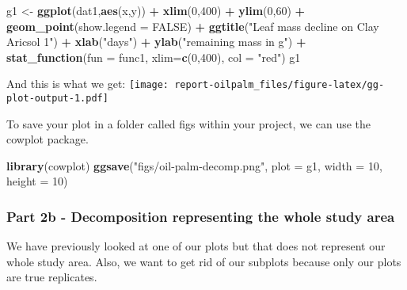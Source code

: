 \documentclass[
]{article}
\newenvironment{Shaded}{\begin{snugshade}}{\end{snugshade}}
\newcommand{\DataTypeTok}[1]{\textcolor[rgb]{0.13,0.29,0.53}{#1}}
\newcommand{\DecValTok}[1]{\textcolor[rgb]{0.00,0.00,0.81}{#1}}
\newcommand{\KeywordTok}[1]{\textcolor[rgb]{0.13,0.29,0.53}{\textbf{#1}}}
\newcommand{\NormalTok}[1]{#1}
\newcommand{\OperatorTok}[1]{\textcolor[rgb]{0.81,0.36,0.00}{\textbf{#1}}}
\newcommand{\OtherTok}[1]{\textcolor[rgb]{0.56,0.35,0.01}{#1}}
\newcommand{\StringTok}[1]{\textcolor[rgb]{0.31,0.60,0.02}{#1}}
\begin{document}
\begin{Shaded}
\begin{Highlighting}[]
\NormalTok{g1 <-}\StringTok{ }\KeywordTok{ggplot}\NormalTok{(dat1,}\KeywordTok{aes}\NormalTok{(x,y)) }\OperatorTok{+}
\StringTok{  }\KeywordTok{xlim}\NormalTok{(}\DecValTok{0}\NormalTok{,}\DecValTok{400}\NormalTok{) }\OperatorTok{+}
\StringTok{  }\KeywordTok{ylim}\NormalTok{(}\DecValTok{0}\NormalTok{,}\DecValTok{60}\NormalTok{) }\OperatorTok{+}
\StringTok{  }\KeywordTok{geom_point}\NormalTok{(}\DataTypeTok{show.legend =} \OtherTok{FALSE}\NormalTok{) }\OperatorTok{+}
\StringTok{  }\KeywordTok{ggtitle}\NormalTok{(}\StringTok{"Leaf mass decline on Clay Aricsol 1"}\NormalTok{) }\OperatorTok{+}
\StringTok{  }\KeywordTok{xlab}\NormalTok{(}\StringTok{"days"}\NormalTok{) }\OperatorTok{+}
\StringTok{  }\KeywordTok{ylab}\NormalTok{(}\StringTok{"remaining mass in g"}\NormalTok{) }\OperatorTok{+}
\StringTok{  }\KeywordTok{stat_function}\NormalTok{(}\DataTypeTok{fun =}\NormalTok{ func1, }\DataTypeTok{xlim=}\KeywordTok{c}\NormalTok{(}\DecValTok{0}\NormalTok{,}\DecValTok{400}\NormalTok{), }\DataTypeTok{col =} \StringTok{"red"}\NormalTok{)}
\NormalTok{g1}
\end{Highlighting}
\end{Shaded}

And this is what we get:
\texttt{[image: report-oilpalm\_files/figure-latex/gg-plot-output-1.pdf]}

To save your plot in a folder called figs within your project, we can
use the cowplot package.

\begin{Shaded}
\begin{Highlighting}[]
\KeywordTok{library}\NormalTok{(cowplot)}
\KeywordTok{ggsave}\NormalTok{(}\StringTok{"figs/oil-palm-decomp.png"}\NormalTok{, }\DataTypeTok{plot =}\NormalTok{ g1, }\DataTypeTok{width =} \DecValTok{10}\NormalTok{, }\DataTypeTok{height =} \DecValTok{10}\NormalTok{)}
\end{Highlighting}
\end{Shaded}

\hypertarget{part-2b---decomposition-representing-the-whole-study-area}{%
\subsubsection{Part 2b - Decomposition representing the whole study
area}\label{part-2b---decomposition-representing-the-whole-study-area}}

We have previously looked at one of our plots but that does not
represent our whole study area. Also, we want to get rid of our subplots
because only our plots are true replicates.
\end{document}
